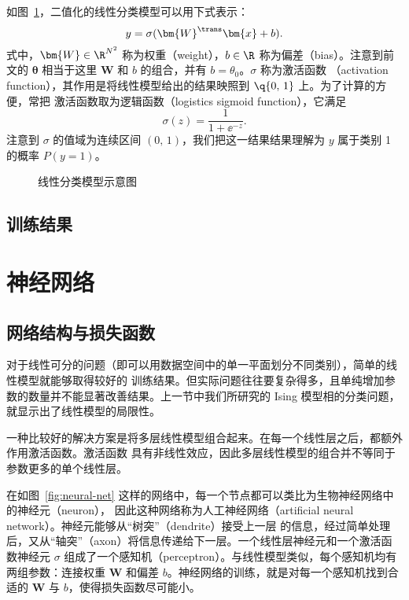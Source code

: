 如图~\ref{fig:linear-layer}，二值化的线性分类模型可以用下式表示：
\begin{equation}
  y = \sigma(\bm{W}^\trans \bm{x} + b).
\end{equation}
式中，$\bm{W}\in\R^{N^2}$ 称为权重（weight），$b\in\R$ 称为偏差（bias）。注意到前文的
$\bm{\theta}$ 相当于这里 $\bm{W}$ 和 $b$ 的组合，并有 $b=\theta_0$。$\sigma$ 称为激活函数
（activation function），其作用是将线性模型给出的结果映照到 $\q{0,\,1}$ 上。为了计算的方便，常把
激活函数取为逻辑函数（logistics sigmoid function），它满足
\begin{equation}
  \sigma(z) = \frac{1}{1+\ee^{-z}}.
\end{equation}
注意到 $\sigma$ 的值域为连续区间 $(0,\,1)$，我们把这一结果结果理解为 $y$ 属于类别 1 的概率
$P(y=1)$。

\begin{figure}[htb]
  \centering
  \caption{线性分类模型示意图}
  \label{fig:linear-layer}
\end{figure}

\subsection{训练结果}

\section{神经网络}

\subsection{网络结构与损失函数}

对于线性可分的问题（即可以用数据空间中的单一平面划分不同类别），简单的线性模型就能够取得较好的
训练结果。但实际问题往往要复杂得多，且单纯增加参数的数量并不能显著改善结果。上一节中我们所研究的
Ising 模型相的分类问题，就显示出了线性模型的局限性。

一种比较好的解决方案是将多层线性模型组合起来。在每一个线性层之后，都额外作用激活函数。激活函数
具有非线性效应，因此多层线性模型的组合并不等同于参数更多的单个线性层。

在如图~\ref{fig:neural-net} 这样的网络中，每一个节点都可以类比为生物神经网络中的神经元（neuron），
因此这种网络称为人工神经网络（artificial neural network）。神经元能够从“树突”（dendrite）接受上一层
的信息，经过简单处理后，又从“轴突”（axon）将信息传递给下一层。一个线性层神经元和一个激活函数神经元
$\sigma$ 组成了一个感知机（perceptron）。与线性模型类似，每个感知机均有两组参数：连接权重 $\bm{W}$
和偏差 $b$。神经网络的训练，就是对每一个感知机找到合适的 $\bm{W}$ 与 $b$，使得损失函数尽可能小。

